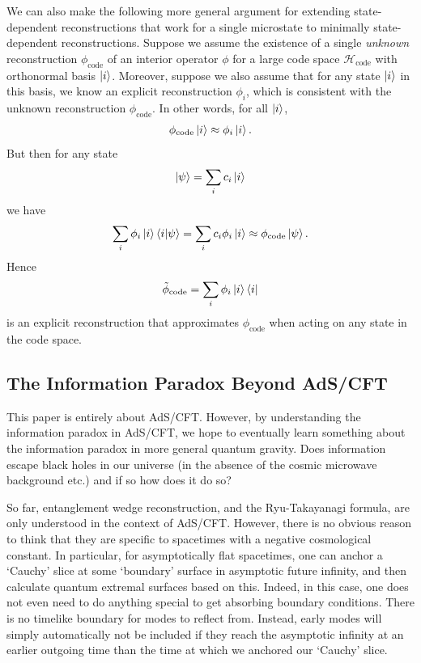 \documentclass[12pt]{article}
\begin{document}
We can also make the following more general argument for extending state-dependent reconstructions that work for a single microstate to minimally state-dependent reconstructions. Suppose we assume the existence of a single \emph{unknown} reconstruction $\phi_\text{code}$ of an interior operator $\phi$ for a large code space $\mathcal{H}_\text{code}$ with orthonormal basis $\ket{i}$. Moreover, suppose we also assume that for any state $\ket{i}$ in this basis, we know an explicit reconstruction $\phi_i$, which is consistent with the unknown reconstruction $\phi_\text{code}$. In other words, for all $\ket{i}$,
\begin{align}
\phi_\text{code} \ket{i} \approx \phi_i \ket{i}.
\end{align}
But then for any state 
$$\ket{\psi} = \sum_i c_i \ket{i}$$
we have
\begin{align}
\sum_i \phi_i \ket{i}\braket{i|\psi} = \sum_i c_i \phi_i \ket{i} \approx \phi_\text{code} \ket{\psi}.
\end{align}
Hence
\begin{align}
\tilde{\phi}_\text{code} = \sum_i \phi_i \ket{i}\bra{i}
\end{align}
is an explicit reconstruction that approximates $\phi_\text{code}$ when acting on any state in the code space.

\subsection{The Information Paradox Beyond AdS/CFT}
This paper is entirely about AdS/CFT. However, by understanding the information paradox in AdS/CFT, we hope to eventually learn something about the information paradox in more general quantum gravity. Does information escape black holes in our universe (in the absence of the cosmic microwave background etc.) and if so how does it do so?

So far, entanglement wedge reconstruction, and the Ryu-Takayanagi formula, are only understood in the context of AdS/CFT. However, there is no obvious reason to think that they are specific to spacetimes with a negative cosmological constant. In particular, for asymptotically flat spacetimes, one can anchor a `Cauchy' slice at some `boundary' surface in asymptotic future infinity, and then calculate quantum extremal surfaces based on this. Indeed, in this case, one does not even need to do anything special to get absorbing boundary conditions. There is no timelike boundary for modes to reflect from. Instead, early modes will simply automatically not be included if they reach the asymptotic infinity at an earlier outgoing time than the time at which we anchored our `Cauchy' slice.
\end{document}
